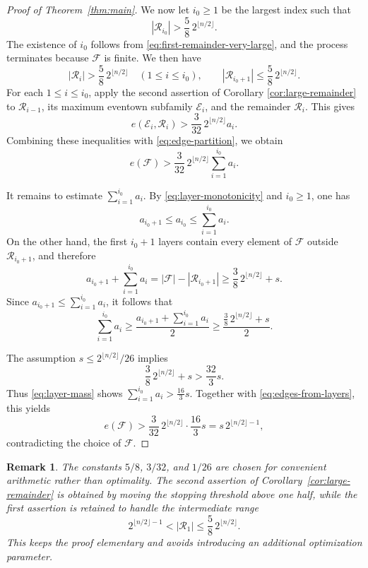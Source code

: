 \documentclass[11pt]{article}
\newtheorem{remark}[theorem]{Remark}
\begin{document}
\begin{proof}[Proof of Theorem~\ref{thm:main}]
We now let \(i_0\ge1\) be the largest index such that
\[
 |\mathcal R_{i_0}|>\frac58\,2^{\lfloor n/2\rfloor}.
\]
The existence of \(i_0\) follows from \eqref{eq:first-remainder-very-large}, and
the process terminates because \(\mathcal F\) is finite.  We then have
\[
 |\mathcal R_i|>\frac58\,2^{\lfloor n/2\rfloor}
 \quad(1\le i\le i_0),
 \qquad
 |\mathcal R_{i_0+1}|
 \le
 \frac58\,2^{\lfloor n/2\rfloor}.
\]
For each \(1\le i\le i_0\), apply the second assertion of Corollary
\ref{cor:large-remainder} to
\(\mathcal R_{i-1}\), its maximum eventown subfamily
\(\mathcal E_i\), and the remainder \(\mathcal R_i\).  This gives
\[
 e(\mathcal E_i,\mathcal R_i)
 >
 \frac{3}{32}\,2^{\lfloor n/2\rfloor}a_i.
\]
Combining these inequalities with \eqref{eq:edge-partition}, we obtain
\begin{equation}
 e(\mathcal F)>\frac{3}{32}\,2^{\lfloor n/2\rfloor}
 \sum_{i=1}^{i_0}a_i.
\label{eq:edges-from-layers}
\end{equation}

It remains to estimate \(\sum_{i=1}^{i_0}a_i\).  By \eqref{eq:layer-monotonicity} and
\(i_0\ge1\), one has
\[
 a_{i_0+1}\le a_{i_0}\le \sum_{i=1}^{i_0}a_i.
\]
On the other hand, the first \(i_0+1\) layers contain every element of
\(\mathcal F\) outside \(\mathcal R_{i_0+1}\), and therefore
\[
 a_{i_0+1}+\sum_{i=1}^{i_0}a_i
 =|\mathcal F|-|\mathcal R_{i_0+1}|
 \ge \frac38\,2^{\lfloor n/2\rfloor}+s.
\]
Since \(a_{i_0+1}\le \sum_{i=1}^{i_0}a_i\), it follows that
\begin{equation}
 \sum_{i=1}^{i_0}a_i\ge
 \frac{a_{i_0+1}+\sum_{i=1}^{i_0}a_i}{2}\ge
 \frac{\frac38\,2^{\lfloor n/2\rfloor}+s}{2}.
\label{eq:layer-mass}
\end{equation}

The assumption \(s\le 2^{\lfloor n/2\rfloor}/26\) implies
\[
 \frac38\,2^{\lfloor n/2\rfloor}+s
 >\frac{32}{3}s.
\]
Thus \eqref{eq:layer-mass} shows
\(\sum_{i=1}^{i_0}a_i>\frac{16}{3}s\). Together with
\eqref{eq:edges-from-layers}, this yields
\[
 e(\mathcal F)
 >
 \frac{3}{32}\,2^{\lfloor n/2\rfloor}\cdot\frac{16}{3}s
 =
 s\,2^{\lfloor n/2\rfloor-1},
\]
contradicting the choice of \(\mathcal F\).
\end{proof}

\begin{remark}\label{rem:constants}
The constants \(5/8\), \(3/32\), and \(1/26\) are chosen for convenient arithmetic
rather than optimality.  The second assertion of
Corollary~\ref{cor:large-remainder} is obtained by moving the stopping
threshold above one half, while the first assertion is retained to handle the
intermediate range
\[
 2^{\lfloor n/2\rfloor-1}<|\mathcal R_1|
 \le \frac58\,2^{\lfloor n/2\rfloor}.
\]
This keeps the proof elementary and avoids introducing an additional optimization parameter.
\end{remark}
\end{document}
